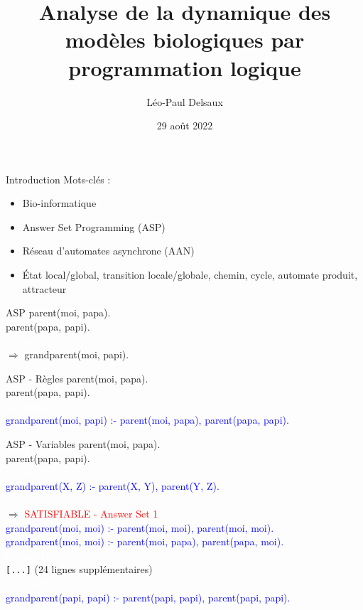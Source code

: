 \documentclass{beamer}
\title{Analyse de la dynamique des modèles biologiques par programmation logique}
\author{Léo-Paul Delsaux}
\institute{Stage effectué au laboratoire CRIStAL de Villeneuve-d'Ascq}
\date{29 août 2022}
\begin{document}
\maketitle

\begin{frame}{Introduction}
	Mots-clés :
	\begin{itemize}
		\item Bio-informatique
		\item Answer Set Programming (ASP)
		\item Réseau d'automates asynchrone (AAN)
		\item \'Etat local/global, transition locale/globale, chemin, cycle, automate produit, attracteur
	\end{itemize}
\end{frame}

\begin{frame}{ASP}
	\pause
	parent(moi, papa).\\
	\pause
	parent(papa, papi).\\
	\textcolor{white}{cheatcode}\\
	\pause
	$\Rightarrow$ grandparent(moi, papi).
\end{frame}

\begin{frame}{ASP - Règles}
	parent(moi, papa).\\
	parent(papa, papi).\\
	\textcolor{white}{cheatcode}\\
	\pause
	\textcolor{blue}{grandparent(moi, papi) :- parent(moi, papa), parent(papa, papi).}\\	
\end{frame}

\begin{frame}{ASP - Variables}
	parent(moi, papa).\\
	parent(papa, papi).\\
	\textcolor{white}{cheatcode}\\
	\pause
	\textcolor{blue}{grandparent(X, Z) :- parent(X, Y), parent(Y, Z).}\\
	\textcolor{white}{cheatcode}\\
	\pause
	$\Rightarrow$ \textcolor{red}{SATISFIABLE - Answer Set 1\\}
		      \textcolor{blue}{grandparent(moi, moi) :- parent(moi, moi), parent(moi, moi).}\\
		      \textcolor{blue}{grandparent(moi, moi) :- parent(moi, papa), parent(papa, moi).}\\
		      \textcolor{white}{cheatcode}\\
		      \verb![...]! (24 lignes supplémentaires)\\
		      \textcolor{white}{cheatcode}\\
		      \textcolor{blue}{grandparent(papi, papi) :- parent(papi, papi), parent(papi, papi).}
\end{frame}
\end{document}
